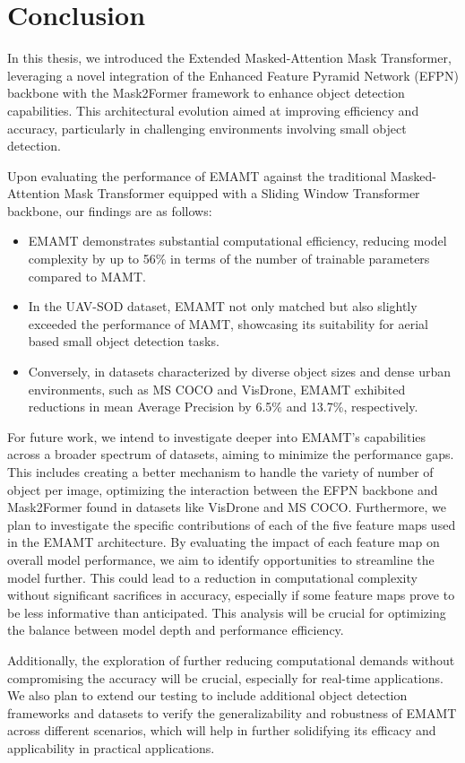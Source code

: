 \chapter{Conclusion}

In this thesis, we introduced the Extended Masked-Attention Mask Transformer, leveraging a novel integration of the 
Enhanced Feature Pyramid Network (EFPN) backbone with the Mask2Former framework to enhance object detection capabilities. 
This architectural evolution aimed at improving efficiency and accuracy, particularly in challenging environments involving small object detection.

Upon evaluating the performance of EMAMT against the traditional Masked-Attention Mask Transformer equipped with a Sliding Window Transformer
backbone, our findings are as follows:

\begin{itemize}
    \item EMAMT demonstrates substantial computational efficiency, reducing model complexity by up to 56\% in terms of the number of trainable parameters compared to MAMT.
    \item In the UAV-SOD dataset, EMAMT not only matched but also slightly exceeded the performance of MAMT, showcasing its suitability for aerial based small object detection tasks.
    \item Conversely, in datasets characterized by diverse object sizes and dense urban environments, such as MS COCO and VisDrone, EMAMT exhibited reductions in mean Average Precision by 6.5\% and 13.7\%, respectively. 
\end{itemize}

For future work, we intend to investigate deeper into EMAMT’s capabilities across a broader spectrum of datasets, aiming to minimize the performance gaps. 
This includes creating a better mechanism to handle the variety of number of object per image, optimizing the interaction between the EFPN backbone and Mask2Former 
found in datasets like VisDrone and MS COCO. Furthermore, we plan to investigate the specific contributions of each of the five feature maps used in the EMAMT architecture. 
By evaluating the impact of each feature map on overall model performance, we aim to identify opportunities to streamline the model further. This could lead to a 
reduction in computational complexity without significant sacrifices in accuracy, especially if some feature maps prove to be less informative than anticipated. 
This analysis will be crucial for optimizing the balance between model depth and performance efficiency.

Additionally, the exploration of further reducing computational demands without compromising the accuracy will be crucial, especially for real-time applications. 
We also plan to extend our testing to include additional object detection frameworks and datasets to verify the generalizability and robustness of EMAMT across 
different scenarios, which will help in further solidifying its efficacy and applicability in practical applications.

